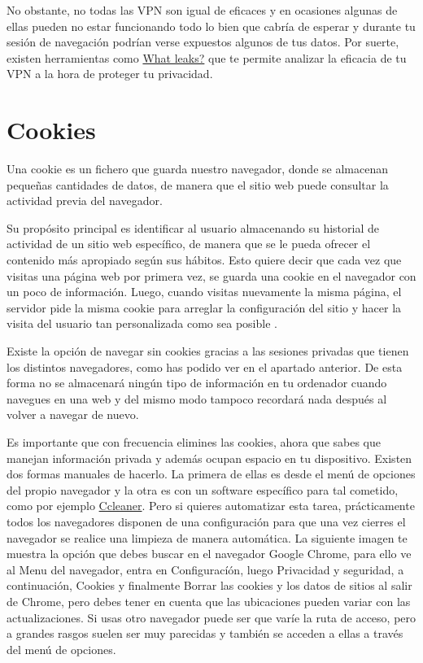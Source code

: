 \documentclass[
  a4paper,
  openany]{book}
\begin{document}
No obstante, no todas las VPN son igual de eficaces y en ocasiones algunas de ellas pueden no estar funcionando todo lo bien que cabría de esperar y durante tu sesión de navegación podrían verse expuestos algunos de tus datos. Por suerte, existen herramientas como \href{https://whatleaks.com/}{What leaks?} que te permite analizar la eficacia de tu VPN a la hora de proteger tu privacidad.

\hypertarget{cookies}{%
\section{Cookies}\label{cookies}}

Una cookie es un fichero que guarda nuestro navegador, donde se almacenan pequeñas cantidades de datos, de manera que el sitio web puede consultar la actividad previa del navegador.

Su propósito principal es identificar al usuario almacenando su historial de actividad de un sitio web específico, de manera que se le pueda ofrecer el contenido más apropiado según sus hábitos. Esto quiere decir que cada vez que visitas una página web por primera vez, se guarda una cookie en el navegador con un poco de información. Luego, cuando visitas nuevamente la misma página, el servidor pide la misma cookie para arreglar la configuración del sitio y hacer la visita del usuario tan personalizada como sea posible \citep{cookies-navegador}.

Existe la opción de navegar sin cookies gracias a las sesiones privadas que tienen los distintos navegadores, como has podido ver en el apartado anterior. De esta forma no se almacenará ningún tipo de información en tu ordenador cuando navegues en una web y del mismo modo tampoco recordará nada después al volver a navegar de nuevo.

Es importante que con frecuencia elimines las cookies, ahora que sabes que manejan información privada y además ocupan espacio en tu dispositivo. Existen dos formas manuales de hacerlo. La primera de ellas es desde el menú de opciones del propio navegador y la otra es con un software específico para tal cometido, como por ejemplo \href{https://www.ccleaner.com/es-es}{Ccleaner}. Pero si quieres automatizar esta tarea, prácticamente todos los navegadores disponen de una configuración para que una vez cierres el navegador se realice una limpieza de manera automática. La siguiente imagen te muestra la opción que debes buscar en el navegador Google Chrome, para ello ve al Menu del navegador, entra en Configuracíón, luego Privacidad y seguridad, a continuación, Cookies y finalmente Borrar las cookies y los datos de sitios al salir de Chrome, pero debes tener en cuenta que las ubicaciones pueden variar con las actualizaciones. Si usas otro navegador puede ser que varíe la ruta de acceso, pero a grandes rasgos suelen ser muy parecidas y también se acceden a ellas a través del menú de opciones.
\end{document}
